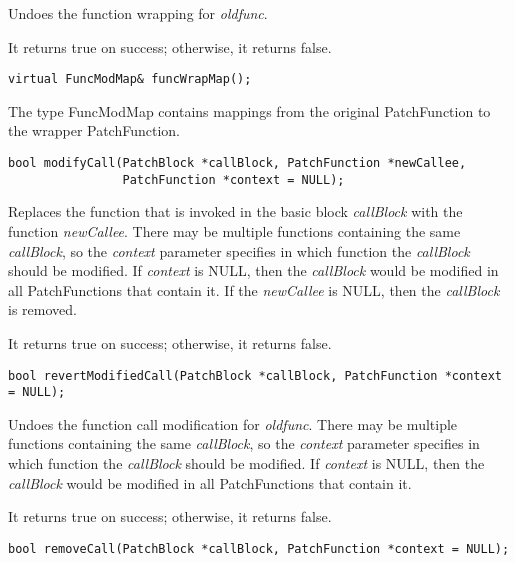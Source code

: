 Undoes the function wrapping for \emph{oldfunc}.

It returns true on success; otherwise, it returns false.


\begin{verbatim}
virtual FuncModMap& funcWrapMap();

\end{verbatim}



The type FuncModMap contains mappings from the original PatchFunction to the
wrapper PatchFunction.


\begin{verbatim}
bool modifyCall(PatchBlock *callBlock, PatchFunction *newCallee,
                PatchFunction *context = NULL);

\end{verbatim}



Replaces the function that is invoked in the basic block \emph{callBlock} with the
function \emph{newCallee}. There may be multiple functions containing the same
\emph{callBlock}, so the \emph{context} parameter specifies in which function the
\emph{callBlock} should be modified. If \emph{context} is NULL, then the \emph{callBlock} would
be modified in all PatchFunctions that contain it. If the \emph{newCallee} is NULL,
then the \emph{callBlock} is removed.

It returns true on success; otherwise, it returns false.


\begin{verbatim}
bool revertModifiedCall(PatchBlock *callBlock, PatchFunction *context = NULL);

\end{verbatim}



Undoes the function call modification for \emph{oldfunc}. There may be multiple
functions containing the same \emph{callBlock}, so the \emph{context} parameter specifies
in which function the \emph{callBlock} should be modified. If \emph{context} is NULL, then
the \emph{callBlock} would be modified in all PatchFunctions that contain it.

It returns true on success; otherwise, it returns false.


\begin{verbatim}
bool removeCall(PatchBlock *callBlock, PatchFunction *context = NULL);

\end{verbatim}



